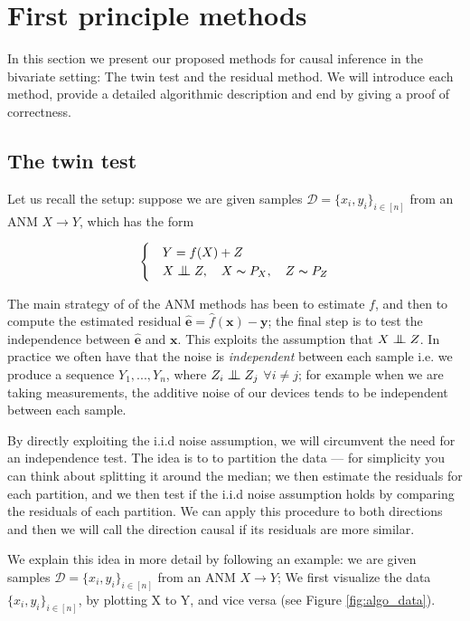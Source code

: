 
\chapter{First principle methods}


In this section we present our proposed methods for causal inference in the 
bivariate setting: The twin test and the residual method. We will introduce each method, 
provide a detailed algorithmic description and end by giving a proof of correctness. 


\section{The twin test}

Let us recall the setup: 
suppose we are given samples $\mathcal{D} = \{x_i, y_i\}_{i \in [n]}$ from an ANM $X \rightarrow Y$, which has the form

\[
    \begin{cases} 
        & Y = f(X) + Z \\
        & X \bigCI Z,\quad X \thicksim P_X,\quad Z \thicksim P_{Z}  
     \end{cases}  
\]

The main strategy of of the ANM methods has been to estimate $f$, and then to compute the estimated
residual $\hat{\mathbf{e}} = \hat{f}(\mathbf{x}) - \mathbf{y}$; the final step is to test the independence between $\hat{\mathbf{e}}$ and $\mathbf{x}$. This exploits 
the assumption that $X \bigCI Z$. In practice we often have that the noise is \textit{independent} between each sample
i.e. we produce a sequence $Y_1, ..., Y_n$, where $Z_i \bigCI Z_j$ $\forall i \neq j$; for example when we are 
taking measurements, the additive noise of our devices tends to be independent between each sample.

By directly exploiting the i.i.d noise assumption, we will circumvent the need for an independence test. The 
idea is to to partition the data ---  for simplicity you can think about splitting it around the median; we 
then estimate the residuals for each partition, and we then test if the i.i.d noise assumption holds by comparing
the residuals of each partition. We can apply this procedure to both directions and then we will call the 
direction causal if its residuals are more similar. 

We explain this idea in more detail by following an example: we are given samples 
$\mathcal{D} = \{x_i, y_i\}_{i \in [n]}$ from an ANM $X \rightarrow Y$; 
We first visualize the data $\{x_i, y_i\}_{i \in [n]}$, by plotting
X to Y, and vice versa (see Figure \ref{fig:algo_data}). 

